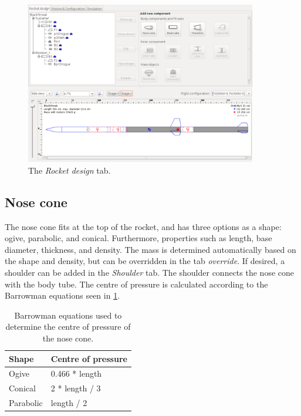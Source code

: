 \documentclass[11pt, a4paper]{article}
\begin{document}
\begin{figure}
  \centering
    \includegraphics[width=0.9\textwidth]{r-design.png}
  \caption{The \emph{Rocket design} tab.}
  \label{fig:tab-design}
\end{figure}

\subsection{Nose cone}

The nose cone fits at the top of the rocket, and has three options as a shape: ogive, parabolic, and conical. Furthermore, properties such as length, base diameter, thickness, and density. The mass is determined automatically based on the shape and density, but can be overridden in the tab \emph{override}. If desired, a shoulder can be added in the \emph{Shoulder} tab. The shoulder connects the nose cone with the body tube.
%
The centre of pressure is calculated according to the Barrowman equations seen in \cref{table:barrowman}.

\begin{table}[]
\centering
\caption{Barrowman equations used to determine the centre of pressure of the nose cone.}
\label{table:barrowman}
\begin{tabular}{|l|l|}
\hline
\textbf{Shape} & \textbf{Centre of pressure} \\ \hline
Ogive          & 0.466 * length              \\ \hline
Conical        & 2 * length / 3              \\ \hline
Parabolic      & length / 2                  \\ \hline
\end{tabular}
\end{table}
\end{document}
